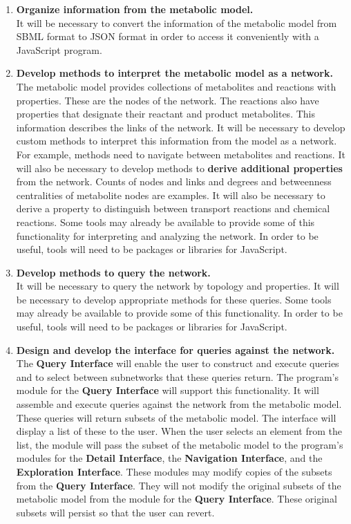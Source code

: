 \begin{enumerate}

\item \textbf{Organize information from the metabolic model.}
\\ It will be necessary to convert the information of the metabolic model from SBML format to JSON format in order to access it conveniently with a JavaScript program.

\item \textbf{Develop methods to interpret the metabolic model as a network.}
\\ The metabolic model provides collections of metabolites and reactions with properties.
These are the nodes of the network.
The reactions also have properties that designate their reactant and product metabolites.
This information describes the links of the network.
It will be necessary to develop custom methods to interpret this information from the model as a network.
For example, methods need to navigate between metabolites and reactions.
It will also be necessary to develop methods to \textbf{derive additional properties} from the network.
Counts of nodes and links and degrees and betweenness centralities of metabolite nodes are examples.
It will also be necessary to derive a property to distinguish between transport reactions and chemical reactions.
Some tools may already be available to provide some of this functionality for interpreting and analyzing the network.
In order to be useful, tools will need to be packages or libraries for JavaScript.

\item \textbf{Develop methods to query the network.}
\\ It will be necessary to query the network by topology and properties.
It will be necessary to develop appropriate methods for these queries.
Some tools may already be available to provide some of this functionality.
In order to be useful, tools will need to be packages or libraries for JavaScript.

\item \textbf{Design and develop the interface for queries against the network.}
\\ The \textbf{Query Interface} will enable the user to construct and execute queries and to select between subnetworks that these queries return.
The program's module for the \textbf{Query Interface} will support this functionality.
It will assemble and execute queries against the network from the metabolic model.
These queries will return subsets of the metabolic model.
The interface will display a list of these to the user.
When the user selects an element from the list, the module will pass the subset of the metabolic model to the program's modules for the \textbf{Detail Interface}, the \textbf{Navigation Interface}, and the \textbf{Exploration Interface}.
These modules may modify copies of the subsets from the \textbf{Query Interface}.
They will not modify the original subsets of the metabolic model from the module for the \textbf{Query Interface}.
These original subsets will persist so that the user can revert.


\end{enumerate}
